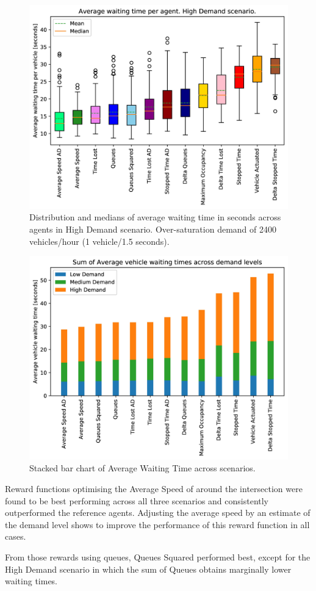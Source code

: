 \documentclass{article}
\begin{document}
\begin{figure}[thpb]
    \centering
    \includegraphics[width=0.7\linewidth]{figures/rand_1_5_ordered_color_DS.jpg}
    \caption{Distribution and medians of average waiting time in seconds across agents in High Demand scenario. Over-saturation demand of 2400 vehicles/hour (1 vehicle/1.5 seconds).}
    \label{fig:high}
\end{figure}

\begin{figure}[thpb]
    \centering
    \includegraphics[width=0.7\linewidth]{figures/stacked_average_delay_ordered_by_sum_DS.jpg}
    \caption{Stacked bar chart of Average Waiting Time across scenarios.}
    \label{fig:stack}
\end{figure}

Reward functions optimising the Average Speed of around the intersection were found to be best performing across all three scenarios and consistently outperformed the reference agents.
Adjusting the average speed by an estimate of the demand level shows to improve the performance of this reward function in all cases.

From those rewards using queues, Queues Squared performed best, except for the High Demand scenario in which the sum of Queues obtains marginally lower waiting times.
\end{document}
